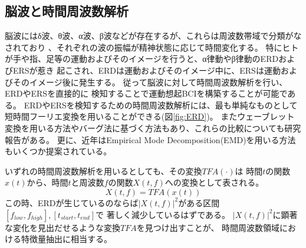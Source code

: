 \subsection{\mc 脳波と時間周波数解析}
脳波にはδ波、θ波、α波、β波などが存在するが、これらは周波数帯域で分類がなされており
、それぞれの波の振幅が精神状態に応じて時間変化する。
特にヒトが手や指、足等の運動およびそのイメージを行うと、α律動やβ律動のERDおよびERSが惹き
起こされ、ERDは運動およびそのイメージ中に、ERSは運動およびそのイメージ後に発生する\cite{ERDとERS}。
従って脳波に対して時間周波数解析を行い、ERDやERSを直接的に
検知することで運動想起BCIを構築することが可能である\cite{Beta波によるBCI}。
ERDやERSを検知するための時間周波数解析には、最も単純なものとして短時間フーリエ変換を用いることができる(図\ref{fig:ERD})。
またウェーブレット変換を用いる方法やバーグ法に基づく方法もあり、これらの比較についても研究報告がある\cite{時間周波数解析の比較}。
更に、近年はEmpirical Mode Decomposition(EMD)を用いる方法もいくつか提案されている\cite{EMD,IMF}。

いずれの時間周波数解析を用いるとしても、その変換\(TFA(\cdot)\)は
時間\(t\)の関数\(x(t)\)から、時間\(t\)と周波数\(f\)の関数\(X(t,f)\)への変換として表される。
\begin{equation}
    X(t,f) = TFA(x(t))
    \label{eq:time-freq}
\end{equation}
この時、ERDが生じているのならば\(|X(t,f)|^2\)がある区間\([f_{low}, f_{high}],[t_{start}, t_{end}]\)で
著しく減少しているはずである。
\(|X(t,f)|^2\)に顕著な変化を見出だせるような変換\(TFA\)を見つけ出すことが、
時間周波数領域における特徴量抽出に相当する。


